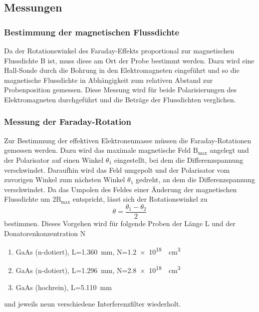     \subsection{Messungen}
        \subsubsection*{Bestimmung der magnetischen Flussdichte}
            Da der Rotationswinkel des Faraday-Effekts proportional zur magnetischen Flussdichte B ist, muss diese am Ort der Probe bestimmt werden. Dazu wird eine Hall-Sonde durch die Bohrung in den Elektromagneten eingeführt und so die magnetische Flussdichte in Abhängigkeit zum relativen Abstand zur Probenposition gemessen. Diese Messung wird für beide Polarisierungen des Elektromagneten durchgeführt und die Beträge der Flussdichten verglichen.
        \newpage   
        \subsubsection*{Messung der Faraday-Rotation}
            Zur Bestimmung der effektiven Elektronenmasse müssen die Faraday-Rotationen gemessen werden. Dazu wird das maximale magnetische Feld $\text{B}_{\text{max}}$ angelegt und der Polarisator auf einen Winkel $\theta_1$ eingestellt, bei dem die Differenzspannung verschwindet. Daraufhin wird das Feld umgepolt und der Polarisator vom zuvorigen Winkel zum nächsten Winkel $\theta_1$ gedreht, an dem die Differenzspannung verschwindet. Da das Umpolen des Feldes einer Änderung der magnetischen Flussdichte um $2\text{B}_{\text{max}}$ entspricht, lässt sich der Rotationswinkel zu 
            \begin{equation}
                \theta = \frac{\theta_1 - \theta_2}{2}
                \label{eqn:zweiwinkel}
            \end{equation}
            bestimmen. Dieses Vorgehen wird für folgende Proben der Länge L und der Donatorenkonzentration N
            \begin{enumerate}
                \item GaAs (n-dotiert), L=\SI{1.360}{\milli\metre}, N=\SI{1.2e18}{\per\cubic\centi\metre}
                \item GaAs (n-dotiert), L=\SI{1.296}{\milli\metre}, N=\SI{2.8e18}{\per\cubic\centi\metre}
                \item GaAs (hochrein), L=\SI{5.110}{\milli\metre}
            \end{enumerate}
            

            und jeweils neun verschiedene Interferenzfilter wiederholt.

        
